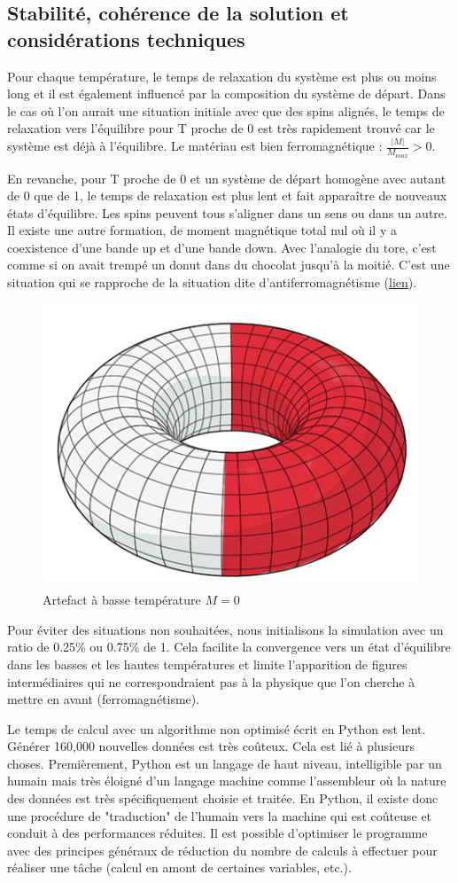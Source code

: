 \documentclass[11pt, parskip=half]{scrartcl} %
\begin{document}
\subsection{Stabilité, cohérence de la solution et considérations techniques}

Pour chaque température, le temps de relaxation du système est plus ou moins long et il est également influencé par la composition du système de départ. Dans le cas où l'on aurait une situation initiale avec que des spins alignés, le temps de relaxation vers l'équilibre pour T proche de 0 est très rapidement trouvé car le système est déjà à l'équilibre. Le matériau est bien ferromagnétique : $\frac{|M|}{M_{max}} > 0$.

En revanche, pour T proche de 0 et un système de départ homogène avec autant de 0 que de 1, le temps de relaxation est plus lent et fait apparaître de nouveaux états d'équilibre. Les spins peuvent tous s'aligner dans un sens ou dans un autre. Il existe une autre formation, de moment magnétique total nul où il y a coexistence d'une bande up et d'une bande down. Avec l'analogie du tore, c'est comme si on avait trempé un donut dans du chocolat jusqu'à la moitié. C'est une situation qui se rapproche de la situation dite d'antiferromagnétisme (\href{https://couleur-science.eu/?d=262e6c--ferromagnetisme-diamagnetisme-paramagnetisme}{lien}).

\begin{figure}[h]
\centering
\includegraphics[width=0.3\linewidth]{./figures/donut.jpg}
\caption{Artefact à basse température $M=0$}
\label{fig:H}
\end{figure}

Pour éviter des situations non souhaitées, nous initialisons la simulation avec un ratio de 0.25\% ou 0.75\% de 1. Cela facilite la convergence vers un état d'équilibre dans les basses et les hautes températures et limite l'apparition de figures intermédiaires qui ne correspondraient pas à la physique que l'on cherche à mettre en avant (ferromagnétisme).

Le temps de calcul avec un algorithme non optimisé écrit en Python est lent. Générer 160,000 nouvelles données est très coûteux. Cela est lié à plusieurs choses. Premièrement, Python est un langage de haut niveau, intelligible par un humain mais très éloigné d'un langage machine comme l'assembleur où la nature des données est très spécifiquement choisie et traitée. En Python, il existe donc une procédure de "traduction" de l'humain vers la machine qui est coûteuse et conduit à des performances réduites. Il est possible d'optimiser le programme avec des principes généraux de réduction du nombre de calculs à effectuer pour réaliser une tâche (calcul en amont de certaines variables, etc.). 
\end{document}
